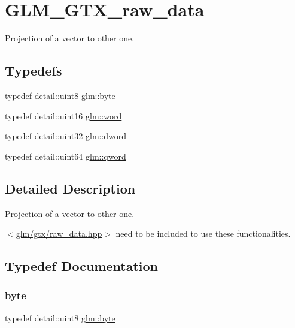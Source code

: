 \hypertarget{group__gtx__raw__data}{}\section{G\+L\+M\+\_\+\+G\+T\+X\+\_\+raw\+\_\+data}
\label{group__gtx__raw__data}


Projection of a vector to other one.  


\subsection*{Typedefs}
\begin{DoxyCompactItemize}
\item 
typedef detail\+::uint8 \hyperlink{group__gtx__raw__data_gacd7fe1f2ad60a57f7d7ad4f1e6836efd}{glm\+::byte}
\item 
typedef detail\+::uint16 \hyperlink{group__gtx__raw__data_ga5617a479d471021b5c773c5e969ba46d}{glm\+::word}
\item 
typedef detail\+::uint32 \hyperlink{group__gtx__raw__data_ga1fc2589df6d44e923cd1820cf14805cf}{glm\+::dword}
\item 
typedef detail\+::uint64 \hyperlink{group__gtx__raw__data_ga32447af289e879589883c9b7e3be1246}{glm\+::qword}
\end{DoxyCompactItemize}


\subsection{Detailed Description}
Projection of a vector to other one. 

$<$\hyperlink{raw__data_8hpp}{glm/gtx/raw\+\_\+data.\+hpp}$>$ need to be included to use these functionalities. 

\subsection{Typedef Documentation}
\mbox{\label{group__gtx__raw__data_gacd7fe1f2ad60a57f7d7ad4f1e6836efd}} 
\subsubsection{\texorpdfstring{byte}{byte}}
{\footnotesize\ttfamily typedef detail\+::uint8 \hyperlink{group__gtx__raw__data_gacd7fe1f2ad60a57f7d7ad4f1e6836efd}{glm\+::byte}}

